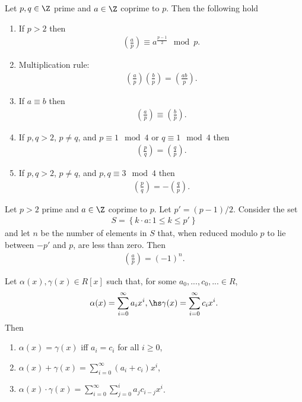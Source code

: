 \documentclass{article}
\begin{document}
\begin{theorem}[Lecture 11]
	Let $p,q\in\Z$ prime and $a\in\Z$ coprime to $p$. Then the following hold
	\begin{enumerate}
		\item If $p>2$ then \begin{align*}
			      \left(\frac{a}{p}\right)\equiv a^{\frac{p-1}{2}} \mod p.
		      \end{align*}
		\item Multiplication rule: \begin{align*}
			      \left(\frac{a}{p}\right)\left(\frac{b}{p}\right)=\left(\frac{ab}{p}\right).
		      \end{align*}
		\item If $a\equiv b$ then \begin{align*}
			      \left(\frac{a}{p}\right)\equiv\left(\frac{b}{p}\right).
		      \end{align*}
		\item If $p,q>2$, $p\not=q$, and $p\equiv 1\mod 4$ or $q\equiv 1\mod 4$ then \begin{align*}
			      \left(\frac{p}{q}\right)=\left(\frac{q}{p}\right).
		      \end{align*}
		\item If $p,q>2$, $p\not=q$, and $p,q\equiv 3\mod 4$ then \begin{align*}
			      \left(\frac{p}{q}\right)=-\left(\frac{q}{p}\right).
		      \end{align*}
	\end{enumerate}
\end{theorem}

\begin{lemma}[Gauss]
	Let $p>2$ prime and $a\in\Z$ coprime to $p$. Let $p'=(p-1)/2$. Consider the set
	\begin{align*}
		S=\left\lbrace k\cdot a : 1\leq k\leq p'\right\rbrace
	\end{align*}
	and let $n$ be the number of elements in $S$ that, when reduced modulo $p$ to lie between
	$-p'$ and $p$, are less than zero. Then
	\begin{align*}
		\left(\frac{a}{p}\right)=(-1)^n.
	\end{align*}
\end{lemma}

\begin{definition}
	Let $\alpha(x),\gamma(x)\in R[x]$ such that, for some
	$a_0,...,c_0,...\in R$,
	\begin{align*}
		\alpha(x)=\sum_{i=0}^\infty a_ix^i,\hs
		\gamma(x)=\sum_{i=0}^\infty c_ix^i.
	\end{align*}
	Then \begin{enumerate}
		\item $\alpha(x)=\gamma(x)$ iff $a_i=c_i$ for all $i\geq 0$,
		\item $\alpha(x)+\gamma(x)=\sum_{i=0}^\infty (a_i+c_i)x^i$,
		\item $\alpha(x)\cdot\gamma(x)=\sum_{i=0}^\infty \sum_{j=0}^i a_jc_{i-j}x^i$.
	\end{enumerate}
\end{definition}
\end{document}
